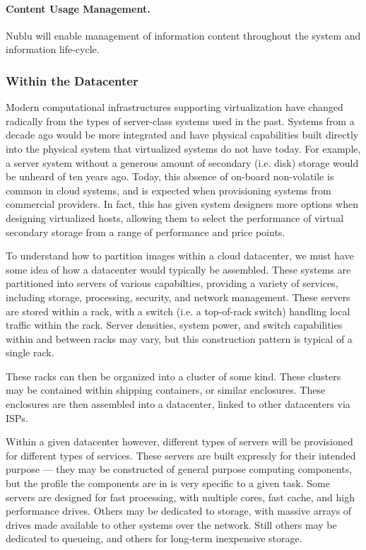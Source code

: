 \documentclass[12pt,letterpaper]{article}
\begin{document}
\paragraph{Content Usage Management.} Nublu will enable management of information content throughout the system and information life-cycle.

\subsubsection{Within the Datacenter}
Modern computational infrastructures supporting virtualization have changed radically from the types of server-class systems used in the past.  Systems from a decade ago would be more integrated and have physical capabilities built directly into the physical system that virtualized systems do not have today. For example, a server system without a generous amount of secondary (i.e. disk) storage would be unheard of ten years ago.  Today, this absence of on-board non-volatile is common in cloud systems, and is expected when provisioning systems from commercial providers.  In fact, this has given system designers more options when designing virtualized hosts, allowing them to select the performance of virtual secondary storage from a range of performance and price points.

To understand how to partition images within a cloud datacenter, we must have some idea of how a datacenter would typically be assembled.  These systems are partitioned into servers of various capabilties, providing a variety of services, including storage, processing, security, and network management.  These servers are stored within a rack, with a switch (i.e. a top-of-rack switch) handling local traffic within the rack.  Server densities, system power, and switch capabilities within and between racks may vary, but this construction pattern is typical of a single rack.

These racks can then be organized into a cluster of some kind.  These clusters may be contained within shipping containers, or similar enclosures.  These enclosures are then assembled into a datacenter, linked to other datacenters via ISPs.

Within a given datacenter however, different types of servers will be provisioned for different types of services.  These servers are built expressly for their intended purpose --- they may be constructed of general purpose computing components, but the profile the components are in is very specific to a given task.  Some servers are designed for fast processing, with multiple cores, fast cache, and high performance drives.  Others may be dedicated to storage, with massive arrays of drives made available to other systems over the network.  Still others may be dedicated to queueing, and others for long-term inexpensive storage.
\end{document}
